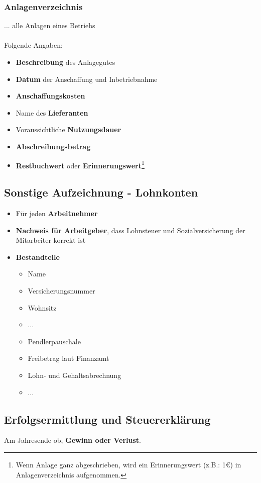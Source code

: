 \documentclass[a4paper, ngerman]{article}
\begin{document}
\subsubsection{Anlagenverzeichnis}
... alle Anlagen eines Betriebs
\\ \\
Folgende Angaben:
\begin{itemize}
    \item \textbf{Beschreibung} des Anlagegutes
    \item \textbf{Datum} der Anschaffung und Inbetriebnahme
    \item \textbf{Anschaffungskosten}
    \item Name des \textbf{Lieferanten}
    \item Voraussichtliche \textbf{Nutzungsdauer}
    \item \textbf{Abschreibungsbetrag}
    \item \textbf{Restbuchwert} oder \textbf{Erinnerungswert}\footnote{Wenn Anlage ganz abgeschrieben, wird ein Erinnerungswert (z.B.: 1€) in Anlagenverzeichnis aufgenommen.}
\end{itemize}
\subsection{Sonstige Aufzeichnung - Lohnkonten}
\begin{itemize}
    \item Für jeden \textbf{Arbeitnehmer}
    \item \textbf{Nachweis für Arbeitgeber}, dass Lohnsteuer und Sozialversicherung der Mitarbeiter korrekt ist
    \item \textbf{Bestandteile}
          \begin{itemize}
              \item Name
              \item Versicherungsnummer
              \item Wohnsitz
              \item ...
              \item Pendlerpauschale
              \item Freibetrag laut Finanzamt
              \item Lohn- und Gehaltsabrechnung
              \item ...
          \end{itemize}
\end{itemize}
\subsection{Erfolgsermittlung und Steuererklärung}
Am Jahresende ob, \textbf{Gewinn oder Verlust}.
\end{document}
